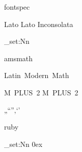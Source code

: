 \RequirePackage
	{ fontspec }


\setmainfont
	{ Lato }
\setsansfont
	{ Lato }
\setmonofont
	{ Inconsolata }

\tl_set:Nn
	\familydefault
	\sfdefault

\RequirePackage
	{ amsmath }
\RequirePackage
	[ math-style = upright ]
	{ unicode-math }

\setmathfont
	{ Latin~Modern~Math }


\setCJKmainfont
	{ M~PLUS~2 }
\setCJKsansfont
	{ M~PLUS~2 }

\normalspacedchars
	{ „“”‚‘’ }

\RequirePackage
	{ ruby }

\tl_set:Nn
	\rubysep
	{ 0ex }
